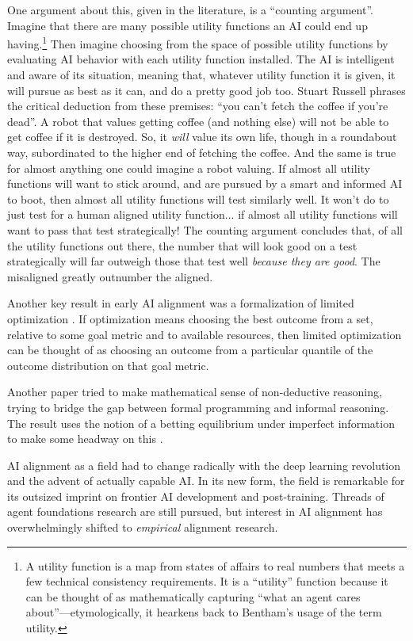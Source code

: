 One argument about this, given in the literature, is a ``counting argument''.
Imagine that there are many possible utility functions an AI could end up
having.\footnote{A utility function is a map from states of affairs to real
numbers that meets a few technical consistency requirements. It is a
``utility'' function because it can be thought of as mathematically capturing
``what an agent cares about''---etymologically, it hearkens back to Bentham's
usage of the term utility.} Then imagine choosing from the space of possible
utility functions by evaluating AI behavior with each utility function
installed. The AI is intelligent and aware of its situation, meaning that,
whatever utility function it is given, it will pursue as best as it can, and do
a pretty good job too. Stuart Russell \cite{russell2019human} phrases the
critical deduction from these premises: ``you can't fetch the coffee if you're
dead''. A robot that values getting coffee (and nothing else) will not be able
to get coffee if it is destroyed. So, it \emph{will} value its own life, though
in a roundabout way, subordinated to the higher end of fetching the coffee. And
the same is true for almost anything one could imagine a robot valuing. If
almost all utility functions will want to stick around, and are pursued by a
smart and informed AI to boot, then almost all utility functions will test
similarly well. It won't do to just test for a human aligned utility
function... if almost all utility functions will want to pass that test
strategically! The counting argument concludes that, of all the utility
functions out there, the number that will look good on a test strategically
will far outweigh those that test well \emph{because they are good}. The
misaligned greatly outnumber the aligned.

Another key result in early AI alignment was a formalization of limited
optimization \cite{taylor2016quantilizers}. If optimization means choosing the
best outcome from a set, relative to some goal metric and to available
resources, then limited optimization can be thought of as choosing an outcome
from a particular quantile of the outcome distribution on that goal metric.

Another paper tried to make mathematical sense of non-deductive reasoning,
trying to bridge the gap between formal programming and informal reasoning. The
result uses the notion of a betting equilibrium under imperfect information to
make some headway on this \cite{garrabrant2020induction}.

AI alignment as a field had to change radically with the deep learning
revolution and the advent of actually capable AI. In its new form, the field is
remarkable for its outsized imprint on frontier AI development and
post-training. Threads of agent foundations research are still pursued, but
interest in AI alignment has overwhelmingly shifted to \emph{empirical}
alignment research.

